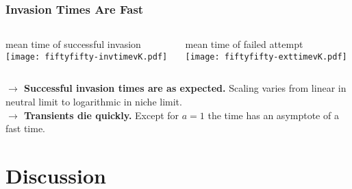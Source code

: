 \documentclass[dvipsnames]{beamer}
\begin{document}
\begin{frame}
\frametitle{Invasion Times Are Fast}
\begin{columns}
	\begin{column}{5.5cm}
		\begin{center}
			mean time of successful invasion\\
			\texttt{[image: fiftyfifty-invtimevK.pdf]}
		\end{center}
	\end{column}
	\begin{column}{5.5cm}
		\begin{center}
			mean time of failed attempt\\
			\texttt{[image: fiftyfifty-exttimevK.pdf]}
		\end{center}
	\end{column}
\end{columns}
\vspace{0.2cm}
\textbf{$\rightarrow$ Successful invasion times are as expected.} Scaling varies from linear in neutral limit to logarithmic in niche limit. \\
\textbf{$\rightarrow$ Transients die quickly.} Except for $a=1$ the time has an asymptote of a fast time. 
\end{frame}



\section[Discussion]{Discussion}

\end{document}
